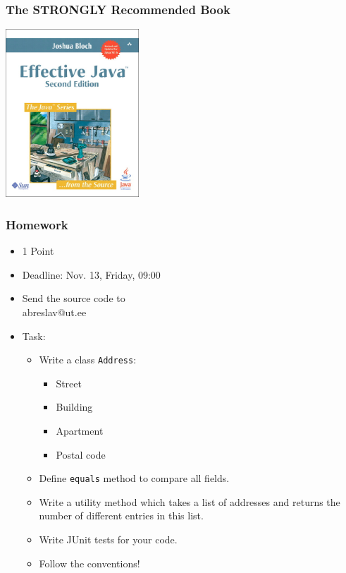 \documentclass[screen]{beamer}
\begin{document}
\begin{frame}[fragile]
\frametitle{The STRONGLY Recommended Book}
\begin{center}
\includegraphics[width=5cm,height=6.3cm]{EJCover.png}
\end{center}
\end{frame}

\begin{frame}[fragile]
\frametitle{Homework}

\begin{itemize}[<+->]
	\item 1 Point
	\item Deadline: Nov. 13, Friday, 09:00
	\item Send the source code to\\
		abreslav@ut.ee
	\item Task:\\
		\begin{itemize}
		\item Write a class \texttt{Address}:
		\begin{itemize}
			\item Street
			\item Building
			\item Apartment
			\item Postal code
		\end{itemize}
		\item Define \texttt{equals} method to compare all fields.\\
		\item Write a utility method which takes a list of addresses and returns the number of different entries in this list.\\
		\item Write JUnit tests for your code.
		\item \alert{Follow the conventions!}
		\end{itemize}
\end{itemize}

\end{frame}
\end{document}

